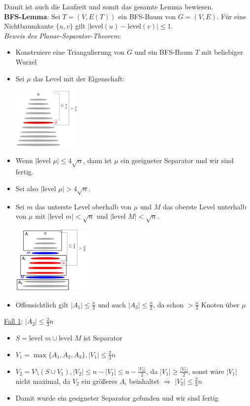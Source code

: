 Damit ist auch die Laufzeit und somit das gesamte Lemma bewiesen.\\

\textbf{BFS-Lemma}: Sei $T = (V,E(T))$ ein BFS-Baum von $G = (V , E)$. Für eine Nichtbaumkante $\{u,v\}$ gilt $|\text{level}(u)-\text{level}(v)|\leq 1$.\\

\textit{Beweis des Planar-Separator-Theorem}: 
\begin{itemize}
	\item Konstruiere eine Triangulierung von $G$ und ein BFS-Baum $T$ mit beliebiger Wurzel
	\item Sei $\mu$ das Level mit der Eigenschaft:
	\begin{center}
		\includegraphics[width=0.26\textwidth]{images/pst-7.png}
	\end{center}
	\item Wenn $|\text{level } \mu|\leq 4\sqrt{n}$, dann ist $\mu$ ein geeigneter Separator und wir sind fertig.
	\item Sei also $|\text{level } \mu|> 4\sqrt{n}$.
	\item Sei $m$ das unterste Level oberhalb von $\mu$ und $M$ das oberste Level unterhalb von $\mu$ mit $|\text{level } m|<\sqrt{n}$ und $|\text{level } M|<\sqrt{n}$.
	\begin{center}
		\includegraphics[width=0.3\textwidth]{images/pst-8.png}
	\end{center}
	\item Offensichtlich gilt $|A_1|\leq\frac{n}{2} \text{ und auch }|A_3|\leq\frac{n}{2}$, da schon $>\frac{n}{2}$ Knoten über $\mu$ 
\end{itemize}
\medskip
\underline{Fall 1}: $|A_2|\leq\frac{2}{3}n$
\begin{itemize}
	\item $S=\text{level }m\cup\text{level }M$ ist Separator
	\item $V_1=\max\{A_1,A_2,A_3\}, |V_1|\leq\frac{2}{3}n$
	\item $V_2=V\setminus(S\cup V_1), |V_2|\leq n-|V_1|\leq n-\frac{|V_2|}{2}$, da $|V_1|\geq\frac{|V_2|}{2}$, sonst wäre $|V_1|$ nicht maximal, da $V_2$ ein größeres $A_i$ beinhaltet $\Rightarrow$ $|V_2|\leq\frac{2}{3}n$
	\item Damit wurde ein geeigneter Separator gefunden und wir sind fertig
\end{itemize}

